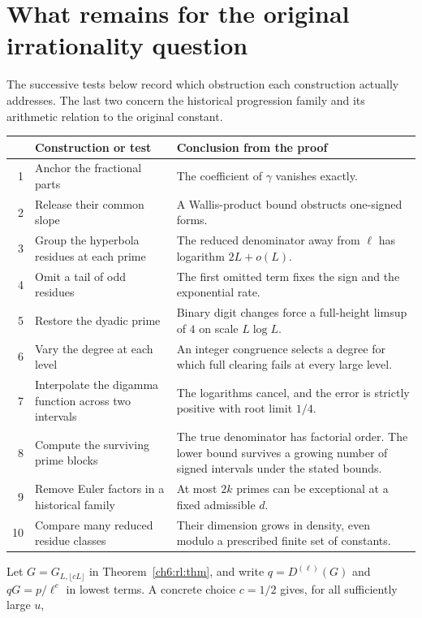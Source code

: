 \documentclass[11pt,a4paper,oneside,openany]{report}
\theoremstyle{remark}\newtheorem{remark}[theorem]{Remark}
\numberwithin{equation}{section}
\begin{document}
\section{What remains for the original irrationality question}
The successive tests below record which obstruction each construction actually addresses. The last two concern the historical progression family and its arithmetic relation to the original constant.
\begin{center}\small
\begin{tabular}{@{}r@{\quad}p{.31\linewidth}@{\hspace{1em}}p{.56\linewidth}@{}}\toprule
& Construction or test & Conclusion from the proof \\ \midrule
1 & Anchor the fractional parts & The coefficient of $\gamma$ vanishes exactly.\\
2 & Release their common slope & A Wallis-product bound obstructs one-signed forms.\\
3 & Group the hyperbola residues at each prime & The reduced denominator away from $\ell$ has logarithm $2L+o(L)$.\\
4 & Omit a tail of odd residues & The first omitted term fixes the sign and the exponential rate.\\
5 & Restore the dyadic prime & Binary digit changes force a full-height limsup of $4$ on scale $L\log L$.\\
6 & Vary the degree at each level & An integer congruence selects a degree for which full clearing fails at every large level.\\
7 & Interpolate the digamma function across two intervals & The logarithms cancel, and the error is strictly positive with root limit $1/4$.\\
8 & Compute the surviving prime blocks & The true denominator has factorial order. The lower bound survives a growing number of signed intervals under the stated bounds.\\
9 & Remove Euler factors in a historical family & At most $2k$ primes can be exceptional at a fixed admissible $d$.\\
10 & Compare many reduced residue classes & Their dimension grows in density, even modulo a prescribed finite set of constants.\\ \bottomrule
\end{tabular}
\end{center}
Let $G=G_{L,\lfloor cL\rfloor}$ in Theorem~\ref{ch6:rl:thm}, and write $q=D^{(\ell)}(G)$ and $qG=p/\ell^e$ in lowest terms. A concrete choice $c=1/2$ gives, for all sufficiently large $u$,
\end{document}
